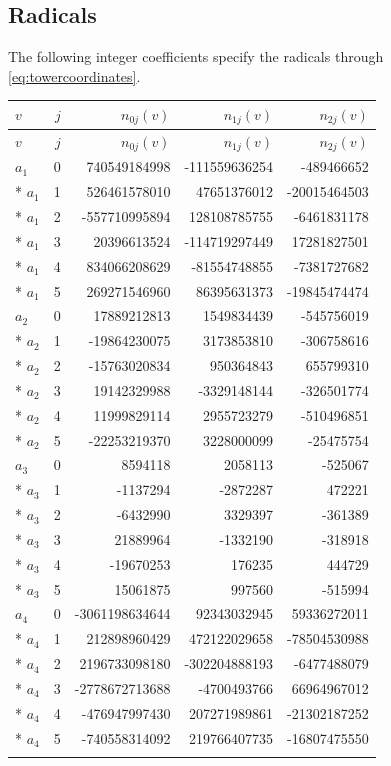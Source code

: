 \documentclass[11pt]{article}
\theoremstyle{remark}\newtheorem{remark}[theorem]{Remark}
\begin{document}
\subsection{Radicals}
The following integer coefficients specify the radicals through \eqref{eq:towercoordinates}.
{\small\setlength{\tabcolsep}{7pt}
\begin{longtable}{@{}lrrrr@{}}
\toprule
$v$&$j$&$n_{0j}(v)$&$n_{1j}(v)$&$n_{2j}(v)$\\\midrule
\endfirsthead
\toprule
$v$&$j$&$n_{0j}(v)$&$n_{1j}(v)$&$n_{2j}(v)$\\\midrule
\endhead
$a_1$&0&740549184998&-111559636254&-489466652\\*
$a_1$&1&526461578010&47651376012&-20015464503\\*
$a_1$&2&-557710995894&128108785755&-6461831178\\*
$a_1$&3&20396613524&-114719297449&17281827501\\*
$a_1$&4&834066208629&-81554748855&-7381727682\\*
$a_1$&5&269271546960&86395631373&-19845474474\\
\addlinespace[3pt]
$a_2$&0&17889212813&1549834439&-545756019\\*
$a_2$&1&-19864230075&3173853810&-306758616\\*
$a_2$&2&-15763020834&950364843&655799310\\*
$a_2$&3&19142329988&-3329148144&-326501774\\*
$a_2$&4&11999829114&2955723279&-510496851\\*
$a_2$&5&-22253219370&3228000099&-25475754\\
\addlinespace[3pt]
$a_3$&0&8594118&2058113&-525067\\*
$a_3$&1&-1137294&-2872287&472221\\*
$a_3$&2&-6432990&3329397&-361389\\*
$a_3$&3&21889964&-1332190&-318918\\*
$a_3$&4&-19670253&176235&444729\\*
$a_3$&5&15061875&997560&-515994\\
\addlinespace[3pt]
$a_4$&0&-3061198634644&92343032945&59336272011\\*
$a_4$&1&212898960429&472122029658&-78504530988\\*
$a_4$&2&2196733098180&-302204888193&-6477488079\\*
$a_4$&3&-2778672713688&-4700493766&66964967012\\*
$a_4$&4&-476947997430&207271989861&-21302187252\\*
$a_4$&5&-740558314092&219766407735&-16807475550\\
\addlinespace[3pt]
\bottomrule
\end{longtable}}
\end{document}
